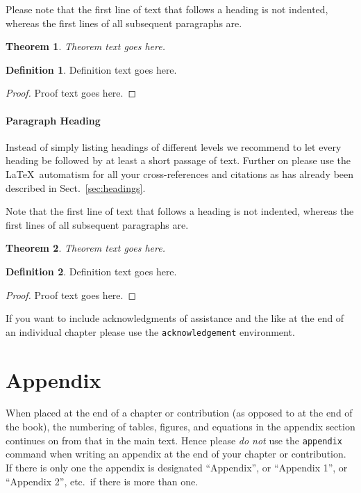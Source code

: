 \documentclass{aip-book}
\newcommand*\cmd[1]{\texttt{#1}} %
\newtheorem{theorem}{Theorem}
\theoremstyle{definition}
\newtheorem{definition}{Definition}
\begin{document}
Please note that the first line of text that follows a heading is not indented, whereas the first lines of all subsequent paragraphs are.

\begin{theorem}
Theorem text goes here.
\end{theorem}

\begin{definition}
Definition text goes here.
\end{definition}

\begin{proof}
Proof text goes here.
\end{proof}

\paragraph{Paragraph Heading}

Instead of simply listing headings of different levels we recommend to let every heading be followed by at least a short passage of text. 
Further on please use the \LaTeX\ automatism for all your cross-references and citations as has already been described in Sect.~\ref{sec:headings}.

Note that the first line of text that follows a heading is not indented, whereas the first lines of all subsequent paragraphs are.

\begin{theorem}
Theorem text goes here.
\end{theorem}

\begin{definition}
Definition text goes here.
\end{definition}

\begin{proof}
Proof text goes here.
\end{proof}

\begin{acknowledgement}
If you want to include acknowledgments of assistance and the like at the end of an individual chapter please use the \cmd{acknowledgement} environment.
\end{acknowledgement}

\section*{Appendix}

When placed at the end of a chapter or contribution (as opposed to at the end of the book), the numbering of tables, figures, and equations in the appendix section continues on from that in the main text. 
Hence please \emph{do not} use the \cmd{appendix} command when writing an appendix at the end of your chapter or contribution. 
If there is only one the appendix is designated “Appendix”, or “Appendix 1”, or “Appendix 2”, etc.~if there is more than one.
\end{document}
